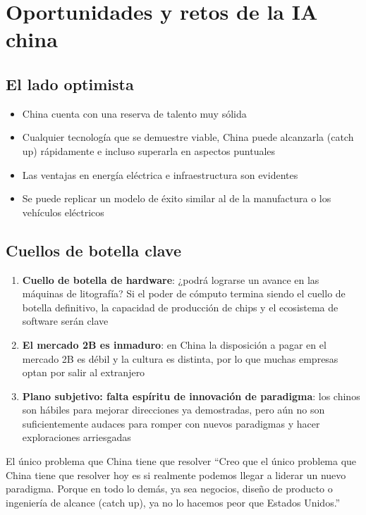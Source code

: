 \section{Oportunidades y retos de la IA china}

\subsection{El lado optimista}

\begin{itemize}
\item China cuenta con una reserva de talento muy sólida
\item Cualquier tecnología que se demuestre viable, China puede alcanzarla (catch up) rápidamente e incluso superarla en aspectos puntuales
\item Las ventajas en energía eléctrica e infraestructura son evidentes
\item Se puede replicar un modelo de éxito similar al de la manufactura o los vehículos eléctricos
\end{itemize}

\subsection{Cuellos de botella clave}

\begin{enumerate}
\item \textbf{Cuello de botella de hardware}: ¿podrá lograrse un avance en las máquinas de litografía? Si el poder de cómputo termina siendo el cuello de botella definitivo, la capacidad de producción de chips y el ecosistema de software serán clave
\item \textbf{El mercado 2B es inmaduro}: en China la disposición a pagar en el mercado 2B es débil y la cultura es distinta, por lo que muchas empresas optan por salir al extranjero
\item \textbf{Plano subjetivo: falta espíritu de innovación de paradigma}: los chinos son hábiles para mejorar direcciones ya demostradas, pero aún no son suficientemente audaces para romper con nuevos paradigmas y hacer exploraciones arriesgadas
\end{enumerate}

\begin{warningbox}{El único problema que China tiene que resolver}
``Creo que el único problema que China tiene que resolver hoy es si realmente podemos llegar a liderar un nuevo paradigma. Porque en todo lo demás, ya sea negocios, diseño de producto o ingeniería de alcance (catch up), ya no lo hacemos peor que Estados Unidos.''
\end{warningbox}

